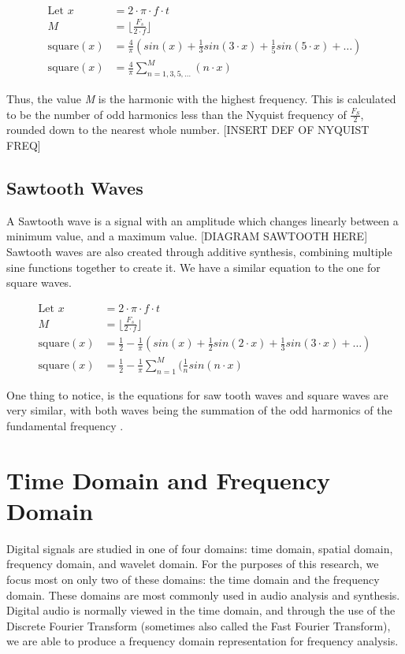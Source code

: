 \begin{align}
    \textrm{Let } x &= 2 \cdot \pi \cdot f \cdot t \\
    M &= \bigg \lfloor \frac{F_s}{2 \cdot f} \bigg \rfloor \\
    \textrm{square}(x) &= \frac{4}{\pi}(sin(x) + \frac{1}{3}sin(3 \cdot x) + \frac{1}{5}sin(5 \cdot x) + \dots) \\
    \textrm{square}(x) &= \frac{4}{\pi}\sum_{n=1, 3, 5, \dots}^{M}(n \cdot x)
\end{align}

Thus, the value \textit{M} is the harmonic with the highest frequency. This is calculated to be the number of odd harmonics less than the Nyquist frequency of $\frac{F_S}{2}$, rounded down to the nearest whole number. [INSERT DEF OF NYQUIST FREQ]

\subsection{Sawtooth Waves}
A Sawtooth wave is a signal with an amplitude which changes linearly between a minimum value, and a maximum value. [DIAGRAM SAWTOOTH HERE] Sawtooth waves are also created through additive synthesis, combining multiple sine functions together to create it. We have a similar equation to the one for square waves. 

\begin{align}
    \textrm{Let } x &= 2 \cdot \pi \cdot f \cdot t \\
    M &= \bigg \lfloor \frac{F_s}{2 \cdot f} \bigg \rfloor \\
    \textrm{square}(x) &= \frac{1}{2} - \frac{1}{\pi}(sin(x) + \frac{1}{2}sin(2 \cdot x) + \frac{1}{3}sin(3 \cdot x) + \dots) \\
    \textrm{square}(x) &= \frac{1}{2} - \frac{1}{\pi}\sum_{n=1}^{M}(\frac{1}{n}sin(n \cdot x)
\end{align}

One thing to notice, is the equations for saw tooth waves and square waves are very similar, with both waves being the summation of the odd harmonics of the fundamental frequency \cite{Tarr_2019}.

\section{Time Domain and Frequency Domain}

Digital signals are studied in one of four domains: time domain, spatial domain, frequency domain, and wavelet domain. For the purposes of this research, we focus most on only two of these domains: the time domain and the frequency domain. These domains are most commonly used in audio analysis and synthesis. Digital audio is normally viewed in the time domain, and through the use of the Discrete Fourier Transform (sometimes also called the Fast Fourier Transform), we are able to produce a frequency domain representation for frequency analysis.

